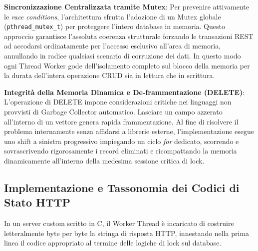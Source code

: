 \documentclass[a4paper,12pt]{article}
\begin{document}
\begin{sloppypar}
\textbf{Sincronizzazione Centralizzata tramite Mutex}:
Per prevenire attivamente le \textit{race conditions}, l'architettura sfrutta l'adozione di un Mutex globale (\texttt{pthread\_mutex\_t}) per proteggere l'intero database in memoria. Questo approccio garantisce l'assoluta coerenza strutturale forzando le transazioni REST ad accodarsi ordinatamente per l'accesso esclusivo all'area di memoria, annullando in radice qualsiasi scenario di corruzione dei dati. In questo modo ogni Thread Worker gode dell'isolamento completo sul blocco della memoria per la durata dell'intera operazione CRUD sia in lettura che in scrittura.

\textbf{Integrità della Memoria Dinamica e De-frammentazione (DELETE)}:
L'operazione di DELETE impone considerazioni critiche nei linguaggi non provvisti di Garbage Collector automatico. Lasciare un campo azzerato all'interno di un vettore genera rapida frammentazione. Al fine di risolvere il problema internamente senza affidarsi a librerie esterne, l'implementazione esegue uno shift a sinistra progressivo impiegando un ciclo \textit{for} dedicato, scorrendo e sovrascrivendo rigorosamente i record eliminati e ricompattando la memoria dinamicamente all'interno della medesima sessione critica di lock.
\end{sloppypar}

\newpage
\subsection{Implementazione e Tassonomia dei Codici di Stato HTTP}
In un server custom scritto in C, il Worker Thread è incaricato di costruire letteralmente byte per byte la stringa di risposta HTTP, innestando nella prima linea il codice appropriato al termine delle logiche di lock sul database. 
\end{document}
